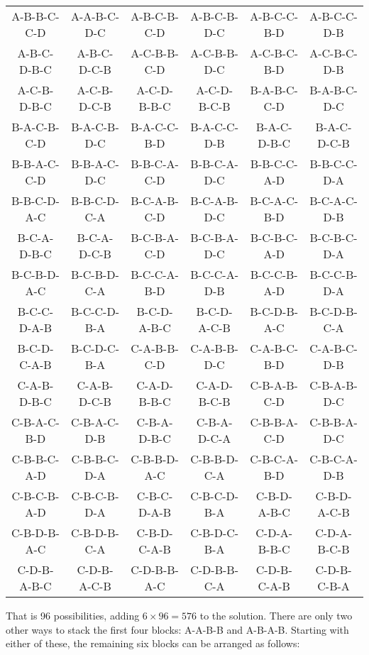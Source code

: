 \documentclass{article}
\begin{document}
\begin{center}
\begin{tabular}{cccccc}
A-B-B-C-C-D & A-A-B-C-D-C & A-B-C-B-C-D & A-B-C-B-D-C & A-B-C-C-B-D & A-B-C-C-D-B \\
A-B-C-D-B-C & A-B-C-D-C-B & A-C-B-B-C-D & A-C-B-B-D-C & A-C-B-C-B-D & A-C-B-C-D-B \\
A-C-B-D-B-C & A-C-B-D-C-B & A-C-D-B-B-C & A-C-D-B-C-B & B-A-B-C-C-D & B-A-B-C-D-C \\
B-A-C-B-C-D & B-A-C-B-D-C & B-A-C-C-B-D & B-A-C-C-D-B & B-A-C-D-B-C & B-A-C-D-C-B \\
B-B-A-C-C-D & B-B-A-C-D-C & B-B-C-A-C-D & B-B-C-A-D-C & B-B-C-C-A-D & B-B-C-C-D-A \\
B-B-C-D-A-C & B-B-C-D-C-A & B-C-A-B-C-D & B-C-A-B-D-C & B-C-A-C-B-D & B-C-A-C-D-B \\
B-C-A-D-B-C & B-C-A-D-C-B & B-C-B-A-C-D & B-C-B-A-D-C & B-C-B-C-A-D & B-C-B-C-D-A \\
B-C-B-D-A-C & B-C-B-D-C-A & B-C-C-A-B-D & B-C-C-A-D-B & B-C-C-B-A-D & B-C-C-B-D-A \\
B-C-C-D-A-B & B-C-C-D-B-A & B-C-D-A-B-C & B-C-D-A-C-B & B-C-D-B-A-C & B-C-D-B-C-A \\
B-C-D-C-A-B & B-C-D-C-B-A & C-A-B-B-C-D & C-A-B-B-D-C & C-A-B-C-B-D & C-A-B-C-D-B \\
C-A-B-D-B-C & C-A-B-D-C-B & C-A-D-B-B-C & C-A-D-B-C-B & C-B-A-B-C-D & C-B-A-B-D-C \\
C-B-A-C-B-D & C-B-A-C-D-B & C-B-A-D-B-C & C-B-A-D-C-A & C-B-B-A-C-D & C-B-B-A-D-C \\
C-B-B-C-A-D & C-B-B-C-D-A & C-B-B-D-A-C & C-B-B-D-C-A & C-B-C-A-B-D & C-B-C-A-D-B \\
C-B-C-B-A-D & C-B-C-B-D-A & C-B-C-D-A-B & C-B-C-D-B-A & C-B-D-A-B-C & C-B-D-A-C-B \\
C-B-D-B-A-C & C-B-D-B-C-A & C-B-D-C-A-B & C-B-D-C-B-A & C-D-A-B-B-C & C-D-A-B-C-B \\
C-D-B-A-B-C & C-D-B-A-C-B & C-D-B-B-A-C & C-D-B-B-C-A & C-D-B-C-A-B & C-D-B-C-B-A
\end{tabular}
\end{center}

That is 96 possibilities, adding $6\times96=576$ to the solution.
There are only two other ways to stack the first four blocks: A-A-B-B and A-B-A-B.
Starting with either of these, the remaining six blocks can be arranged as follows:
\end{document}
